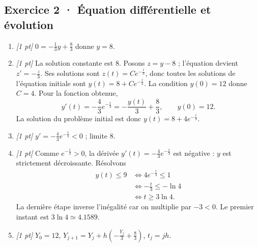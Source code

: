 \subsection*{Exercice 2 · Équation différentielle et évolution}\begin{enumerate}

\item \textit{[1 pt]} $0=-\frac{1}{3}y+\frac{8}{3}$ donne $y=8$.

\item \textit{[1 pt]} La solution constante est $8$. Posons $z=y-8$ ; l'équation devient $z'=-\frac{z}{3}$. Ses solutions sont $z(t)=Ce^{-\frac{t}{3}}$, donc toutes les solutions de l'équation initiale sont $y(t)=8+Ce^{-\frac{t}{3}}$.
La condition $y(0)=12$ donne $C=4$. Pour la fonction obtenue,
\[y'(t)=-\frac{4}{3}e^{-\frac{t}{3}}=-\frac{y(t)}{3}+\frac{8}{3},\qquad y(0)=12.\]
La solution du problème initial est donc $y(t)=8+4e^{-\frac{t}{3}}$.

\item \textit{[1 pt]} $y'=-\frac{4}{3}e^{-\frac{t}{3}}<0$ ; limite $8$.

\item \textit{[1 pt]} Comme $e^{-\frac{t}{3}}>0$, la dérivée $y'(t)=-\frac{4}{3}e^{-\frac{t}{3}}$ est négative : $y$ est strictement décroissante. Résolvons
\[\begin{aligned}y(t)\le 9&\Longleftrightarrow 4e^{-\frac{t}{3}}\le1\\&\Longleftrightarrow -\frac{t}{3}\le-\ln 4\\&\Longleftrightarrow t\ge 3\ln 4.\end{aligned}\]
La dernière étape inverse l'inégalité car on multiplie par $-3<0$. Le premier instant est $3\ln 4\simeq\num{4,1589}$.

\item \textit{[1 pt]} $Y_0=12$, $Y_{j+1}=Y_j+h(-\frac{Y_j}{3}+\frac{8}{3})$, $t_j=jh$.

\end{enumerate}

